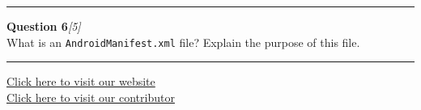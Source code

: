 \documentclass[11pt,a4paper]{article}
\newcommand{\pts}[1]{\hfill   \textit{[#1]}}
\begin{document}
\medskip\rule{\linewidth}{0.2pt}\medskip




\noindent   \textbf{Question 6}\pts{5} \\
What is an   \texttt{AndroidManifest.xml} file? Explain the purpose of this file.

\vfill\rule{\linewidth}{0.4pt}

\begin{center}\small
\href{https://bhu-exam.vercel.app/}{Click here to visit our website}\\[4pt]
\href{https://me-aryan.vercel.app/}{Click here to visit our contributor}
\end{center}
\end{document}
